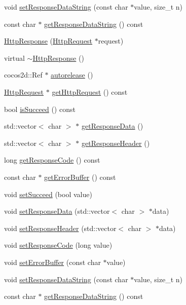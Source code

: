 \begin{DoxyCompactItemize}
\item 
void \hyperlink{classnetwork_1_1HttpResponse_a9e2b4a15006d28a3d6128d3de3c615f7}{set\+Response\+Data\+String} (const char $\ast$value, size\+\_\+t n)
\item 
const char $\ast$ \hyperlink{classnetwork_1_1HttpResponse_a6526a4a5c1247a20ab171fa246218b85}{get\+Response\+Data\+String} () const
\item 
\hyperlink{classnetwork_1_1HttpResponse_a6d9176e90ac973214c91496bb2dee460}{Http\+Response} (\hyperlink{classnetwork_1_1HttpRequest}{Http\+Request} $\ast$request)
\item 
virtual \hyperlink{classnetwork_1_1HttpResponse_aa04ed598ec5a712beb9c2805d7da7d5e}{$\sim$\+Http\+Response} ()
\item 
cocos2d\+::\+Ref $\ast$ \hyperlink{classnetwork_1_1HttpResponse_a1b2e5c8062533484d3cbf5ca26b91f8f}{autorelease} ()
\item 
\hyperlink{classnetwork_1_1HttpRequest}{Http\+Request} $\ast$ \hyperlink{classnetwork_1_1HttpResponse_a9f5228a87f350055ae7316d6dc26e26f}{get\+Http\+Request} () const
\item 
bool \hyperlink{classnetwork_1_1HttpResponse_a3c1b4884e358688855ee21b8cd1bd0dd}{is\+Succeed} () const
\item 
std\+::vector$<$ char $>$ $\ast$ \hyperlink{classnetwork_1_1HttpResponse_a476f45e6514da88f0ce5ba462dc2235a}{get\+Response\+Data} ()
\item 
std\+::vector$<$ char $>$ $\ast$ \hyperlink{classnetwork_1_1HttpResponse_a04a9c96a83fb6282cfe1462d0e3345d6}{get\+Response\+Header} ()
\item 
long \hyperlink{classnetwork_1_1HttpResponse_aa968e433339f10f30bee2998e0c237d4}{get\+Response\+Code} () const
\item 
const char $\ast$ \hyperlink{classnetwork_1_1HttpResponse_a93f2be80baf4a6f82e7e7e0bf3399b43}{get\+Error\+Buffer} () const
\item 
void \hyperlink{classnetwork_1_1HttpResponse_ad553ec4853bd1bd0b1cecd52f541e0bb}{set\+Succeed} (bool value)
\item 
void \hyperlink{classnetwork_1_1HttpResponse_ae53dc439344a00b7af4c5ffd1d4ad3bd}{set\+Response\+Data} (std\+::vector$<$ char $>$ $\ast$data)
\item 
void \hyperlink{classnetwork_1_1HttpResponse_a31318c91d033c09d4d54aa00edf9d5fb}{set\+Response\+Header} (std\+::vector$<$ char $>$ $\ast$data)
\item 
void \hyperlink{classnetwork_1_1HttpResponse_a97dff55588b04d216edeaac03c8bf159}{set\+Response\+Code} (long value)
\item 
void \hyperlink{classnetwork_1_1HttpResponse_a45fe52ae0cb41f622a4e5e40f3b0a8ca}{set\+Error\+Buffer} (const char $\ast$value)
\item 
void \hyperlink{classnetwork_1_1HttpResponse_a9e2b4a15006d28a3d6128d3de3c615f7}{set\+Response\+Data\+String} (const char $\ast$value, size\+\_\+t n)
\item 
const char $\ast$ \hyperlink{classnetwork_1_1HttpResponse_a6526a4a5c1247a20ab171fa246218b85}{get\+Response\+Data\+String} () const
\end{DoxyCompactItemize}
